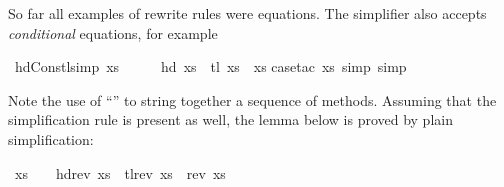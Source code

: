 \begin{isabellebody}
\isamarkuptrue%
%
\begin{isamarkuptext}%
%
So far all examples of rewrite rules were equations. The simplifier also
accepts \emph{conditional} equations, for example%
\end{isamarkuptext}%
\isamarkuptrue%
\isamarkupfalse%
\ hd{}Cons{}tl{}simp{}{}\ {}xs\ {}\ {}{}\ \ {}\ \ hd\ xs\ {}\ tl\ xs\ {}\ xs{}\isanewline
%
\isadelimproof
%
\endisadelimproof
%
\isatagproof
{}\isamarkupfalse%
{}case{}tac\ xs{}\ simp{}\ simp{}\isanewline
{}\isamarkupfalse%
%
\endisatagproof
{\isafoldproof}%
%
\isadelimproof
%
\endisadelimproof
%
\begin{isamarkuptext}%
\noindent
Note the use of ``'' to string together a
sequence of methods. Assuming that the simplification rule
is present as well,
the lemma below is proved by plain simplification:%
\end{isamarkuptext}%
\isamarkuptrue%
\isamarkupfalse%
\ {}xs\ {}\ {}{}\ {}\ hd{}rev\ xs{}\ {}\ tl{}rev\ xs{}\ {}\ rev\ xs{}%

\end{isabellebody}
